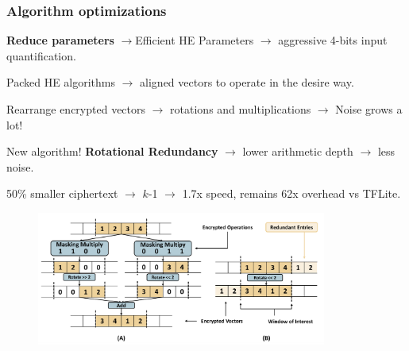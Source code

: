\documentclass[10pt,handout]{beamer}
\begin{document}
\begin{frame}
\frametitle{Algorithm optimizations}
    \textbf{Reduce parameters} $\rightarrow$Efficient HE Parameters $\rightarrow$ aggressive 4-bits input quantification.
    \vspace{-0.2cm}

    \pause
Packed HE algorithms $\rightarrow$  aligned vectors to operate in the desire way.
    \vspace{-0.2cm}

Rearrange encrypted vectors $\rightarrow$ rotations and multiplications  $\rightarrow$ Noise grows a lot!

    \pause
    \vspace{-0.2cm}
    New algorithm! \textbf{Rotational Redundancy} $\rightarrow$ lower arithmetic depth $\rightarrow$ less noise.

    \vspace{-0.2cm}
    50\% smaller ciphertext $\rightarrow$ $k$-1 $\rightarrow$ 1.7x speed, remains 62x overhead vs TFLite.
    \vspace{-0.2cm}
    \pause
\begin{figure}
    \includegraphics[width=0.85\textwidth]{rotation.png}
\end{figure}
\end{frame}



%
%
%
%
%
%
%
%
\end{document}
